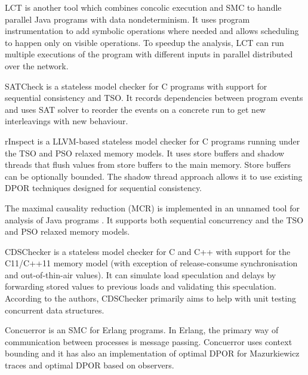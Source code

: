 LCT  is another tool which combines concolic execution and SMC to handle parallel Java programs with data nondeterminism.
It uses program instrumentation to add symbolic operations where needed and allows scheduling to happen only on visible operations.
To speedup the analysis, LCT can run multiple executions of the program with different inputs in parallel distributed over the network.

SATCheck  is a stateless model checker for C programs with support for sequential consistency and TSO.
It records dependencies between program events and uses SAT solver to reorder the events on a concrete run to get new interleavings with new behaviour.

rInspect  is a LLVM-based stateless model checker for C
programs running under the TSO and PSO relaxed memory models.
It uses store buffers and shadow threads that flush values from store buffers
to the main memory.
Store buffers can be optionally bounded.
The shadow thread approach allows it to use existing DPOR techniques designed
for sequential consistency.

The maximal causality reduction (MCR) is implemented in an unnamed tool for analysis of Java programs .
It supports both sequential concurrency and the TSO and PSO relaxed memory models.

CDSChecker  is a stateless model checker for C and C++ with support for the C11/C++11 memory model (with exception of release-consume synchronisation and out-of-thin-air values).
It can simulate load speculation and delays by forwarding stored values to previous loads and validating this speculation.
According to the authors, CDSChecker primarily aims to help with unit testing concurrent data structures.

Concuerror  is an SMC for Erlang programs.
In Erlang, the primary way of communication between processes is message passing.
Concuerror uses context bounding and it has also an implementation of optimal DPOR for Mazurkiewicz traces and optimal DPOR based on observers.


